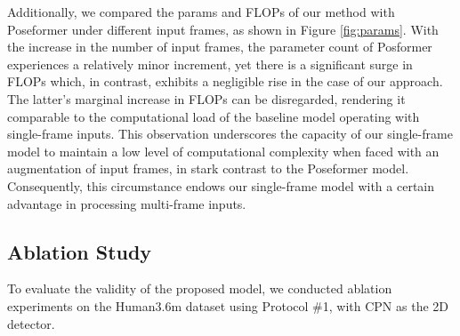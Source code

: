 \documentclass[journal]{IEEEtran}
\begin{document}
Additionally, we compared the params and FLOPs of our method with Poseformer \cite{zheng20213d} under different input frames, as shown in Figure \ref{fig:params}. With the increase in the number of input frames, the parameter count of Posformer experiences a relatively minor increment, yet there is a significant surge in FLOPs which, in contrast, exhibits a negligible rise in the case of our approach. The latter's marginal increase in FLOPs can be disregarded, rendering it comparable to the computational load of the baseline model operating with single-frame inputs. This observation underscores the capacity of our single-frame model to maintain a low level of computational complexity when faced with an augmentation of input frames, in stark contrast to the Poseformer model. Consequently, this circumstance endows our single-frame model with a certain advantage in processing multi-frame inputs.



\subsection{Ablation Study}

To evaluate the validity of the proposed model, we conducted ablation experiments on the Human3.6m dataset using Protocol \#1, with CPN \cite{chen2018cascaded} as the 2D detector.
\end{document}
